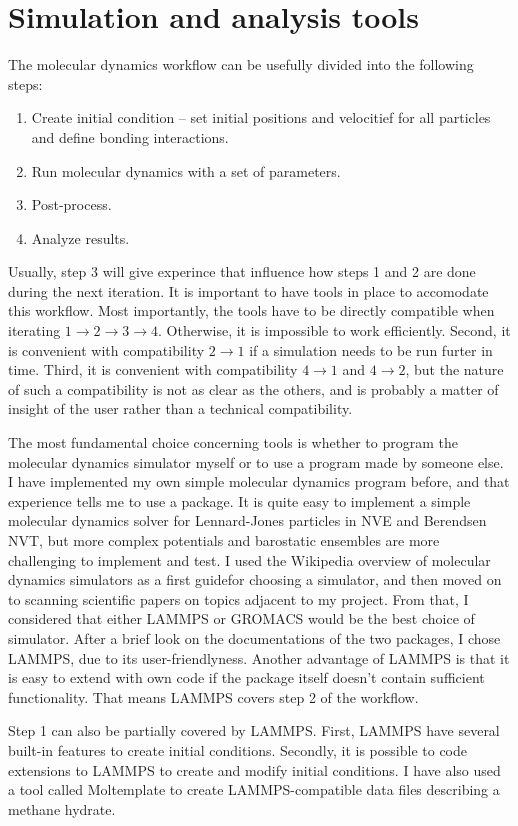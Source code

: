 \chapter{Simulation and analysis tools}
\label{ch:tools}
The molecular dynamics workflow can be usefully divided into the following steps: 
\begin{enumerate}
\item Create initial condition -- set initial positions and velocitief for all particles and define bonding interactions.
\item Run molecular dynamics with a set of parameters.
\item Post-process.
\item Analyze results.
\end{enumerate}
Usually, step 3 will give experince that influence how steps 1 and 2 are done during the next iteration. It is important to have tools in place to accomodate this workflow. Most importantly, the tools have to be directly compatible when iterating $1 \to 2\to 3\to 4$. Otherwise, it is impossible to work efficiently. Second, it is convenient with compatibility $2\to 1$ if a simulation needs to be run furter in time. Third, it is convenient with compatibility $4 \to 1$ and $4 \to 2$, but the nature of such a compatibility is not as clear as the others, and is probably a matter of insight of the user rather than a technical compatibility.

The most fundamental choice concerning tools is whether to program the molecular dynamics simulator myself or to use a program made by someone else. I have implemented my own simple molecular dynamics program before, and that experience tells me to use a package. It is quite easy to implement a simple molecular dynamics solver for Lennard-Jones particles in NVE and Berendsen NVT, but more complex potentials and barostatic ensembles are more challenging to implement and test. I used the Wikipedia overview of molecular dynamics simulators as a first guidefor choosing a simulator, and then moved on to scanning scientific papers on topics adjacent to my project. From that, I considered that either LAMMPS or GROMACS would be the best choice of simulator. After a brief look on the documentations of the two packages, I chose LAMMPS, due to its user-friendlyness. Another advantage of LAMMPS is that it is easy to extend with own code if the package itself doesn't contain sufficient functionality. That means LAMMPS covers step 2 of the workflow. 

Step 1 can also be partially covered by LAMMPS. First, LAMMPS have several built-in features to create initial conditions. Secondly, it is possible to code extensions to LAMMPS to create and modify initial conditions. I have also used a tool called Moltemplate to create LAMMPS-compatible data files describing a methane hydrate.

